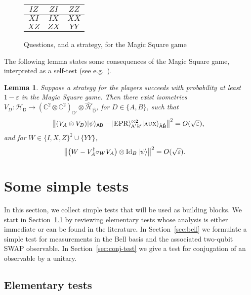 \documentclass[11pt]{article}
\newtheorem{lemma}[theorem]{Lemma}
\theoremstyle{remark}
\theoremstyle{definition}
\newcommand{\ket}[1]{|#1\rangle}
\newcommand{\Id}{\ensuremath{\mathop{\rm Id}\nolimits}}
\newcommand{\reg}[1]{{\textsf{#1}}}
\newcommand{\C}{\ensuremath{\mathbb{C}}}
\newcommand{\mH}{\mathcal{H}}
\newcommand{\eps}{\varepsilon}
\newcommand{\EPR}{{\rm EPR}}
\newcommand{\aux}{\textsc {aux}}
\begin{document}
\begin{figure}[H]
\begin{center}
\begin{tabular}{|c|c|c|}
\hline
$IZ$ & $ZI$ & $ZZ$ \\
\hline
$XI$ & $IX$ & $XX$ \\
\hline
$XZ$ & $ZX$ & $YY$\\
\hline
\end{tabular}
\end{center}
\caption{Questions, and a strategy, for the Magic Square game}
\label{fig:ms}
\end{figure}

The following lemma states some consequences of the Magic Square game, interpreted as a self-test (see e.g.~\cite{WBMS16}). 

\begin{lemma}\label{lem:ms-rigid}
Suppose a strategy for the players succeeds with probability at least $1-\eps$ in the Magic Square game. Then there exist  isometries $V_D:\mH_\reg{D} \to (\C^2\otimes \C^2)_{\reg{D'}}\otimes \hat{\mH}_{\hat{\reg{D}}}$, for $D\in\{A,B\}$, such that
$$\big\| (V_A \otimes V_B) \ket{\psi}_{\reg{AB}} - \ket{\EPR}_{\reg{A}'\reg{B}'}^{\otimes 2} \ket{\aux}_{\hat{\reg{A}}\hat{\reg{B}}} \big\|^2 = O(\sqrt{\eps}),$$
and for $W\in \{I,X,Z\}^2 \cup \{YY\}$,
\begin{align*}
\big\| \big(W -V_A^\dagger \sigma_W V_A\big) \otimes \Id_B \ket{\psi} \big\|^2 &= O(\sqrt{\eps}).
\end{align*}
\end{lemma}

\section{Some simple tests}
\label{sec:clifford-test}

In this section, we collect simple tests that will be used as building blocks. We start in Section~\ref{sec:elementary} by reviewing elementary tests whose analysis is either immediate or can be found in the literature. In Section~\ref{sec:bell} we formulate a simple test for measurements in the Bell basis and the associated two-qubit SWAP observable. In Section~\ref{sec:conj-test} we give a test for conjugation of an observable by a unitary. 

\subsection{Elementary tests}
\label{sec:elementary}
\end{document}
